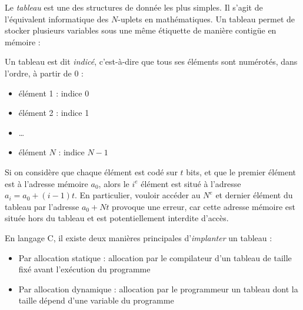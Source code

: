 \documentclass[../../../main.tex]{subfiles}
\begin{document}
 
Le \textit{tableau} est une des structures de donnée les plus simples. Il s'agit de l'équivalent informatique des $N$-uplets en mathématiques. Un tableau permet de stocker plusieurs variables sous une même étiquette de manière contigüe en mémoire : 

\begin{minipage}{\textwidth}
	\begin{center}
		
	\end{center}
\end{minipage} 

Un tableau est dit \textit{indicé}, c'est-à-dire que tous ses éléments sont numérotés, dans l'ordre, à partir de 0 :
\begin{itemize}
	\item élément 1 : indice 0
	\item élément 2 : indice 1
	\item \dots
	\item élément $N$ : indice $N - 1$
\end{itemize}
Si on considère que chaque élément est codé sur $t$ bits, et que le premier élément est à l'adresse mémoire $a_{0}$, alors le $i^e$ élément est situé à l'adresse $a_{i} = a_{0} + (i - 1)t$. En particulier, vouloir accéder au $N^e$ et dernier élément du tableau par l'adresse $a_{0} + Nt$ provoque une erreur, car cette adresse mémoire est située hors du tableau et est potentiellement interdite d'accès.
 
\begin{minipage}{\textwidth}
	\begin{center}
		
	\end{center}
\end{minipage}
 
En langage C, il existe deux manières principales d'\textit{implanter} un tableau :
\begin{itemize}
	\item Par allocation statique : allocation par le compilateur d'un tableau de taille fixé avant l'exécution du programme
	\item Par allocation dynamique : allocation par le programmeur un tableau dont la taille dépend d'une variable du programme
\end{itemize}
\end{document}
